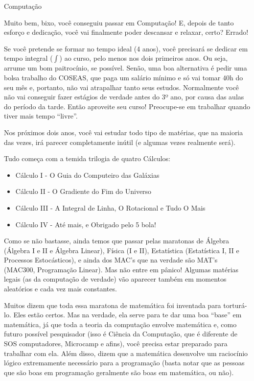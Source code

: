 \begin{subsecao}{Computação}

Muito bem, bixo, você conseguiu passar em Computação! E, depois de tanto esforço
e dedicação, você vai finalmente poder descansar e relaxar, certo? Errado!

Se você pretende se formar no tempo ideal (4 anos), você precisará se dedicar
em tempo integral ($\int$) ao curso, pelo menos nos dois primeiros anos. Ou
seja, arrume um bom paitrocínio, se possível. Senão, uma boa alternativa é
pedir uma bolsa trabalho do COSEAS, que paga um salário mínimo e só vai
tomar 40h do seu mês e, portanto, não vai atrapalhar tanto seus estudos.
Normalmente você não vai conseguir fazer estágios de verdade antes do 3º
ano, por causa das aulas do período da tarde. Então aproveite seu curso! 
Preocupe-se em trabalhar quando tiver mais tempo ``livre''.

Nos próximos dois anos, você vai estudar todo tipo de matérias, que na maioria
das vezes, irá parecer completamente inútil (e algumas vezes realmente
será).

Tudo começa com a temida trilogia de quatro Cálculos:
\begin{itemize}
\item Cálculo I - O Guia do Computeiro das Galáxias
\item Cálculo II - O Gradiente do Fim do Universo
\item Cálculo III - A Integral de Linha, O Rotacional e Tudo O Mais
\item Cálculo IV - Até mais, e Obrigado pelo 5 bola!
\end{itemize}

Como se não bastasse, ainda temos que passar pelas maratonas
de Álgebra (Álgebra I e II e Álgebra Linear), Física (I e II),
Estatística (Estatística I, II e Processos Estocásticos), e ainda dos MAC's que
na verdade são MAT's (MAC300, Programação Linear). Mas não entre em pânico!
Algumas matérias legais (as da computação de verdade) vão aparecer também em
momentos aleatórios e cada vez mais constantes.

Muitos dizem que toda essa maratona de matemática foi inventada para
torturá-lo. Eles estão certos. Mas na verdade, ela serve para te dar uma
boa ``base'' em matemática, já que toda a teoria da computação envolve
matemática e, como futuro possível pesquisador (isso é Ciência da Computação,
que é diferente de SOS computadores, Microcamp e afins), você precisa estar
preparado para trabalhar com ela. Além disso, dizem que a matemática desenvolve
um raciocínio lógico extremamente necessário para a programação (basta notar
que as pessoas que são boas em programação geralmente são boas em matemática,
ou não).


\end{subsecao}
